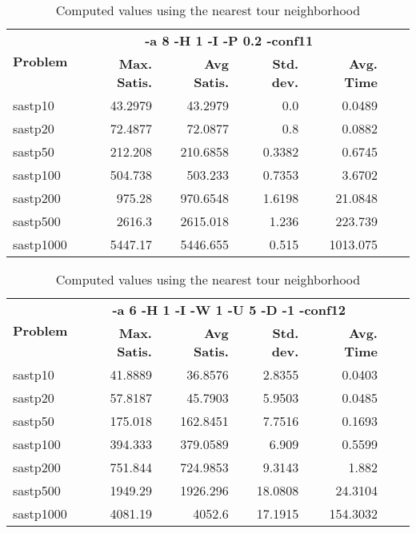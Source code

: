 \documentclass{article}
\begin{document}
\begin{table}[b!]
  \vspace{-6mm}%
  \caption{Computed values using the nearest tour neighborhood}
  \label{tab:NearestTour}
  \setlength{\tabcolsep}{1.4mm}
  \centering
  \begin{tabular}{lrrrrrr}
   \multirow{2}{*}{\bfseries Problem} &
      \multicolumn{4}{c}{\bfseries -a 8 -H 1 -I -P 0.2 -conf11 } \\
    &
    \bfseries Max. Satis. &
    \bfseries Avg Satis. &
    \bfseries Std. dev. &
    \bfseries Avg. Time 
    \\\hline

sastp10 & 43.2979 & 43.2979 & 0.0 & 0.0489 \\ 
sastp20 & 72.4877 & 72.0877 & 0.8 & 0.0882 \\ 
sastp50 & 212.208 & 210.6858 & 0.3382 & 0.6745 \\ 
sastp100 & 504.738 & 503.233 & 0.7353 & 3.6702 \\ 
sastp200 & 975.28 & 970.6548 & 1.6198 & 21.0848 \\ 
sastp500 & 2616.3 & 2615.018 & 1.236 & 223.739 \\ 
sastp1000 & 5447.17 & 5446.655 & 0.515 & 1013.075 
    \\\hline
  \end{tabular}

\end{table}

\begin{table}[b!]
  \vspace{-6mm}%
  \caption{Computed values using the nearest tour neighborhood}
  \label{tab:NearestTour}
  \setlength{\tabcolsep}{1.4mm}
  \centering
  \begin{tabular}{lrrrrrr}
   \multirow{2}{*}{\bfseries Problem} &
      \multicolumn{4}{c}{\bfseries -a 6 -H 1 -I -W 1 -U 5 -D -1 -conf12 } \\
    &
    \bfseries Max. Satis. &
    \bfseries Avg Satis. &
    \bfseries Std. dev. &
    \bfseries Avg. Time 
    \\\hline
sastp10 & 41.8889 & 36.8576 & 2.8355 & 0.0403 \\ 
sastp20 & 57.8187 & 45.7903 & 5.9503 & 0.0485 \\ 
sastp50 & 175.018 & 162.8451 & 7.7516 & 0.1693 \\ 
sastp100 & 394.333 & 379.0589 & 6.909 & 0.5599 \\ 
sastp200 & 751.844 & 724.9853 & 9.3143 & 1.882 \\ 
sastp500 & 1949.29 & 1926.296 & 18.0808 & 24.3104 \\ 
sastp1000 & 4081.19 & 4052.6 & 17.1915 & 154.3032
    \\\hline
  \end{tabular}

\end{table}
\end{document}

